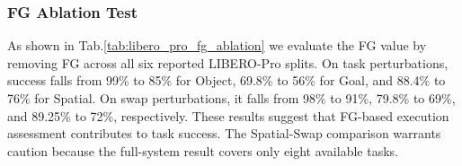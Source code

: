 \documentclass{article} %
\begin{document}
\subsubsection{FG Ablation Test}
\noindent
\begin{minipage}[c]{0.51\textwidth} %
As shown in Tab.\ref{tab:libero_pro_fg_ablation} we evaluate the FG value by removing FG across all six reported LIBERO-Pro splits. On task perturbations, success falls from 99\% to 85\% for Object, 69.8\% to 56\% for Goal, and 88.4\% to 76\% for Spatial. On swap perturbations, it falls from 98\% to 91\%, 79.8\% to 69\%, and 89.25\% to 72\%, respectively. These results suggest that FG-based execution assessment contributes to task success. The Spatial-Swap comparison warrants caution because the full-system result covers only eight available tasks.
\end{minipage}%
\hfill%
\begin{minipage}[c]{0.46\textwidth} %
\centering
{}
\label{tab:libero_pro_fg_ablation}
\vspace{0.3em}


\vspace{0.3em}
\begin{minipage}{\linewidth}
\footnotesize
\end{minipage}
\end{minipage}
\end{document}
